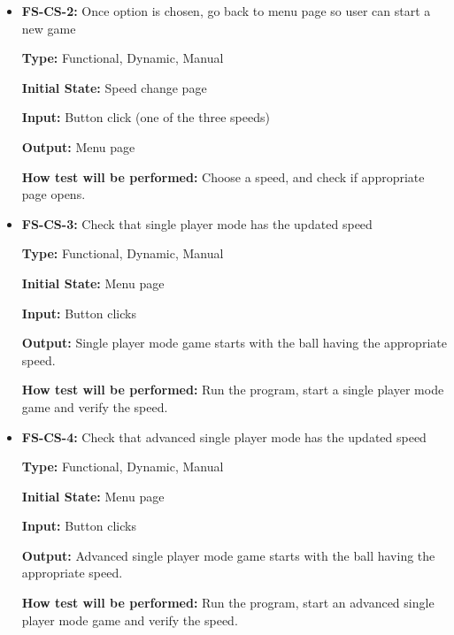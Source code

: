\documentclass[12pt,letterpaper]{article}
\begin{document}
\begin{reqbox}
	\begin{itemize}
	\item \textbf{FS-CS-2: }Once option is chosen, go back to menu page so user can start a new game

	\textbf{Type: }Functional, Dynamic, Manual

	\textbf{Initial State: }Speed change page

	\textbf{Input: }Button click (one of the three speeds)	

	\textbf{Output: }Menu page

	\textbf{How test will be performed: }Choose a speed, and check if appropriate page opens.
	\end{itemize}
\end{reqbox}

\begin{reqbox}
	\begin{itemize}
	\item \textbf{FS-CS-3: }Check that single player mode has the updated speed

	\textbf{Type: }Functional, Dynamic, Manual

	\textbf{Initial State: }Menu page

	\textbf{Input: }Button clicks	

	\textbf{Output: }Single player mode game starts with the ball having the appropriate speed.

	\textbf{How test will be performed: }Run the program, start a single player mode game and verify the speed.
	\end{itemize}
\end{reqbox}

\begin{reqbox}
	\begin{itemize}
	\item \textbf{FS-CS-4: }Check that advanced single player mode has the updated speed

	\textbf{Type: }Functional, Dynamic, Manual

	\textbf{Initial State: }Menu page

	\textbf{Input: }Button clicks

	\textbf{Output: }Advanced single player mode game starts with the ball having the appropriate speed.

	\textbf{How test will be performed: }Run the program, start an advanced single player mode game and verify the speed.
	\end{itemize}
\end{reqbox}
\end{document}
